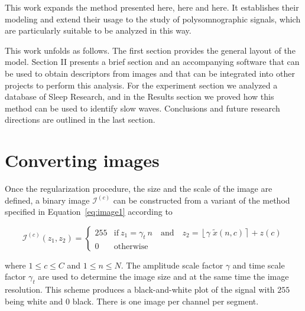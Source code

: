 \documentclass[review]{elsarticle}
\begin{document}
This work  expands the method presented here, here and here.  It establishes their modeling and extend their usage to the study of polysomnographic signals, which are particularly suitable to be analyzed in this way.

This work unfolds as follows.  The first section provides the general layout of the model.  Section II presents a brief section and an accompanying software that can be used to obtain descriptors from images and that can be integrated into other projects to perform this analysis.  For the experiment section we analyzed a database of Sleep Research, and in the Results section we proved how this method can be used to identify slow waves.   Conclusions and future research directions are outlined in the last section.

\section{Converting images}

Once the regularization procedure,  the size and the scale of the image are defined,  a binary image $\mathcal{I}^{(c)}$ can be constructed from a variant of the method specified in Equation~\ref{eq:image1} according to

\begin{equation}
\mathcal{I}^{(c)}(z_1,z_2) = \left\{ \begin{array}{rl}
255 & \text{if} \   z_1 = \gamma_{t} \  n \quad \text{and}  \quad z_2 = \left\lfloor \gamma \; \tilde{x}(n,c) \right\rceil + z(c) \\
0   & \mbox{otherwise}
\end{array}\right.
\label{eq:images}
\end{equation}

\noindent  where  $1 \leq c \leq C$ and $1 \leq n \leq N$. The amplitude scale factor $\gamma$ and time scale factor $\gamma_{t}$ are used to determine the image size and at the same time the image resolution. This scheme produces a black-and-white plot of the signal with $255$ being white and $0$ black.  There is one image per channel per segment. 

\end{document}
